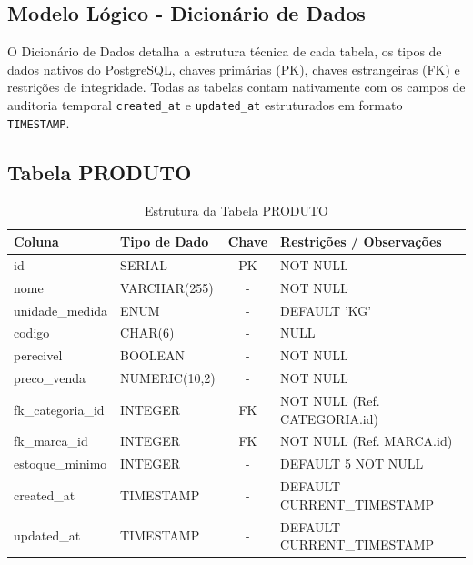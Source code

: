 \documentclass[
	12pt,				%
	openany,			%
	oneside,			%
	a4paper,			%
	english,			%
	french,				%
	spanish,			%
	brazil				%
	]{abntex2}
\begin{document}
\begin{apendicesenv}
\newpage
\section{Modelo Lógico - Dicionário de Dados}

O Dicionário de Dados detalha a estrutura técnica de cada tabela, os tipos de dados nativos do PostgreSQL, chaves primárias (PK), chaves estrangeiras (FK) e restrições de integridade. Todas as tabelas contam nativamente com os campos de auditoria temporal \texttt{created\_at} e \texttt{updated\_at} estruturados em formato \texttt{TIMESTAMP}.

\subsection{Tabela PRODUTO}
\begin{table}[H]
\centering
\caption{Estrutura da Tabela PRODUTO}
\begin{tabular}{|l|p{4cm}|c|p{6cm}|}
\hline
\textbf{Coluna} & \textbf{Tipo de Dado} & \textbf{Chave} & \textbf{Restrições / Observações} \\ \hline
id & SERIAL & PK & NOT NULL \\ \hline
nome & VARCHAR(255) & - & NOT NULL \\ \hline
unidade\_medida & ENUM & - & DEFAULT 'KG' \\ \hline
codigo & CHAR(6) & - & NULL \\ \hline
perecivel & BOOLEAN & - & NOT NULL \\ \hline
preco\_venda & NUMERIC(10,2) & - & NOT NULL \\ \hline
fk\_categoria\_id & INTEGER & FK & NOT NULL (Ref. CATEGORIA.id) \\ \hline
fk\_marca\_id & INTEGER & FK & NOT NULL (Ref. MARCA.id) \\ \hline
estoque\_minimo & INTEGER & - & DEFAULT 5 NOT NULL \\ \hline
created\_at & TIMESTAMP & - & DEFAULT CURRENT\_TIMESTAMP \\ \hline
updated\_at & TIMESTAMP & - & DEFAULT CURRENT\_TIMESTAMP \\ \hline
\end{tabular}
\end{table}


\end{apendicesenv}
\end{document}
